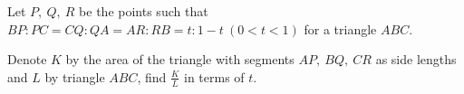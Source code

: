 Let $ P,\ Q,\ R$ be the points such that $ BP : PC = CQ : QA = AR : RB = t : 1-t\ (0 < t < 1)$ for a triangle $ ABC$.

Denote $ K$ by the area of the triangle with segments $ AP,\ BQ,\ CR$ as side lengths and $ L$ by triangle $ ABC$, find $ \frac{K}{L}$ in terms of $ t$.

